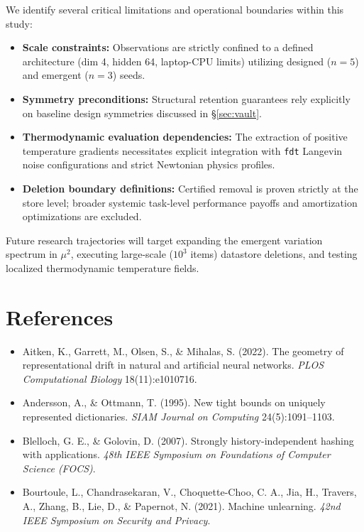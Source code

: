 \documentclass{article}
\begin{document}
We identify several critical limitations and operational boundaries within this study:
\begin{itemize}
\item \textbf{Scale constraints:} Observations are strictly confined to a defined architecture (dim 4, hidden 64, laptop-CPU limits) utilizing designed ($n=5$) and emergent ($n=3$) seeds.
\item \textbf{Symmetry preconditions:} Structural retention guarantees rely explicitly on baseline design symmetries discussed in \S\ref{sec:vault}.
\item \textbf{Thermodynamic evaluation dependencies:} The extraction of positive temperature gradients necessitates explicit integration with \texttt{fdt} Langevin noise configurations and strict Newtonian physics profiles.
\item \textbf{Deletion boundary definitions:} Certified removal is proven strictly at the store level; broader systemic task-level performance payoffs and amortization optimizations are excluded.
\end{itemize}

Future research trajectories will target expanding the emergent variation spectrum in $\mu^2$, executing large-scale ($10^3$ items) datastore deletions, and testing localized thermodynamic temperature fields.

\clearpage
\appendix

\section*{References}
\begin{itemize}
\item Aitken, K., Garrett, M., Olsen, S., \& Mihalas, S. (2022). The geometry of representational drift in natural and artificial neural networks. \emph{PLOS Computational Biology} 18(11):e1010716.
\item Andersson, A., \& Ottmann, T. (1995). New tight bounds on uniquely represented dictionaries. \emph{SIAM Journal on Computing} 24(5):1091--1103.
\item Blelloch, G. E., \& Golovin, D. (2007). Strongly history-independent hashing with applications. \emph{48th IEEE Symposium on Foundations of Computer Science (FOCS)}.
\item Bourtoule, L., Chandrasekaran, V., Choquette-Choo, C. A., Jia, H., Travers, A., Zhang, B., Lie, D., \& Papernot, N. (2021). Machine unlearning. \emph{42nd IEEE Symposium on Security and Privacy}.
\end{itemize}
\end{document}
